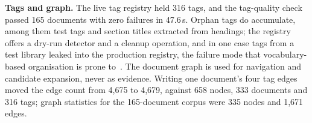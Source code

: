 \textbf{Tags and graph.} The live tag registry held 316 tags, and the tag-quality check passed 165 documents with zero failures in 47.6\,s. Orphan tags do accumulate, among them test tags and section titles extracted from headings; the registry offers a dry-run detector and a cleanup operation, and in one case tags from a test library leaked into the production registry, the failure mode that vocabulary-based organisation is prone to~\cite{golder-tagging-2006}. The document graph is used for navigation and candidate expansion, never as evidence. Writing one document's four tag edges moved the edge count from 4{,}675 to 4{,}679, against 658 nodes, 333 documents and 316 tags; graph statistics for the 165-document corpus were 335 nodes and 1{,}671 edges.
